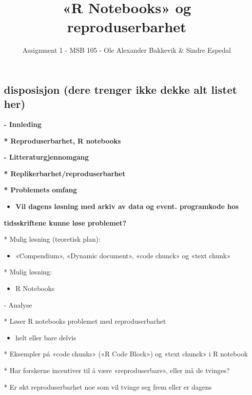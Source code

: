 \documentclass[
  12pt,
  norsk,
]{article}
\title{«R Notebooks» og reproduserbarhet}
\author{Assignment 1 - MSB 105 - Ole Alexander Bakkevik \& Sindre
Espedal}
\date{}
\providecommand{\tightlist}{%
  \setlength{\itemsep}{0pt}\setlength{\parskip}{0pt}}
\begin{document}
\maketitle

\hypertarget{disposisjon-dere-trenger-ikke-dekke-alt-listet-her}{%
\subsection{disposisjon (dere trenger ikke dekke alt listet
her)}\label{disposisjon-dere-trenger-ikke-dekke-alt-listet-her}}

\textbf{- Innleding}

\textbf{* Reproduserbarhet, R notebooks}

\textbf{- Litteraturgjennomgang}

\textbf{* Replikerbarhet/reproduserbarhet}

\textbf{* Problemets omfang}

\begin{itemize}
\tightlist
\item
  \textbf{Vil dagens løsning med arkiv av data og event. programkode
  hos}
\end{itemize}

\textbf{tidsskriftene kunne løse problemet?}

* Mulig løsning (teoretisk plan):

\begin{itemize}
\tightlist
\item
  «Compendium», «Dynamic document», «code chunck» og «text chunk»
\end{itemize}

* Mulig løsning:

\begin{itemize}
\tightlist
\item
  R Notebooks
\end{itemize}

- Analyse

* Løser R notebooks problemet med reproduserbarhet

\begin{itemize}
\tightlist
\item
  helt eller bare delvis
\end{itemize}

* Eksempler på «code chunks» («R Code Block») og «text chunck» i R
notebook

* Har forskerne incentiver til å være «reproduserbare», eller må de
tvinges?

* Er økt reproduserbarhet noe som vil tvinge seg frem eller er dagens
\end{document}
